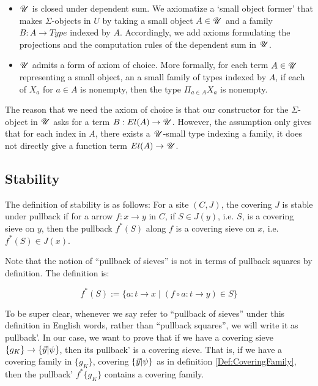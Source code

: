 \begin{itemize}
  \item $\mathscr{U}$ is closed under dependent sum. We axiomatize a `small object former' that makes $\Sigma$-objects in $U$ by
  taking a small object $A\in \mathscr{U}$ and a family $B:A\to Type$ indexed by $A$. Accordingly, we add axioms formulating
  the projections and the computation rules of the dependent sum in $\mathscr{U}$.
  \item $\mathscr{U}$ admits a form of axiom of choice. More formally, for each term $A\in \mathscr{U}$ representing a 
  small object, an a small family of types indexed by $A$, if each of $X_a$ for $a\in A$ is nonempty, then the type 
  $\Pi_{a\in A}X_a$ is nonempty.
\end{itemize}


The reason that we need the axiom of choice is that our constructor for the $\Sigma$-object in $\mathscr{U}$ asks
for a term $B: El(A)\to \mathscr{U}$. However, the assumption only gives that for each index in $A$, there exists a $\mathscr{U}$-small
type indexing a family, it does not directly give a function term $El(A)\to \mathscr{U}$.





\subsection{Stability}

The definition of stability is as follows: For a site $(C,J)$, the covering $J$ is stable under pullback if for a arrow $f:x\to y$ in $C$, 
if $S\in J(y)$, i.e. $S$, is a covering sieve on $y$, then the pullback $f^*(S)$ along $f$ is a covering sieve on $x$, i.e. $f^*(S) \in J(x)$.

Note that the notion of ``pullback of sieves'' is not in terms of pullback squares by definition. The definition is:


\begin{equation*}
  f^*(S) := \{a: t \to x \mid (f\circ a: t\to y) \in S\}
\end{equation*}

To be super clear, whenever we say refer to ``pullback of sieves'' under this definition in English words, rather than ``pullback squares'', we will write it
as pullback'. 
In our case, we want to prove that if we have a covering sieve $\{g_K\}\to \{ \vec{y} | \psi \}$, then its pullback' is a covering sieve.
That is, if we have a covering family in $\{g_K\}$, covering $\{ \vec{y} | \psi \}$ as in definition \ref{Def:CoveringFamily}, then the pullback'
$f^*\{g_K\}$ contains a covering family.

